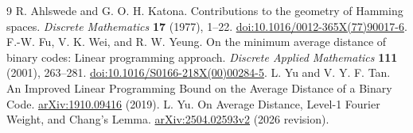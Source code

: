 \documentclass[11pt]{article}
\begin{document}
\begin{thebibliography}{9}
 R. Ahlswede and G. O. H. Katona. Contributions to the geometry of Hamming spaces. \emph{Discrete Mathematics} \textbf{17} (1977), 1--22. \href{https://doi.org/10.1016/0012-365X(77)90017-6}{doi:10.1016/0012-365X(77)90017-6}.
 F.-W. Fu, V. K. Wei, and R. W. Yeung. On the minimum average distance of binary codes: Linear programming approach. \emph{Discrete Applied Mathematics} \textbf{111} (2001), 263--281. \href{https://doi.org/10.1016/S0166-218X(00)00284-5}{doi:10.1016/S0166-218X(00)00284-5}.
 L. Yu and V. Y. F. Tan. An Improved Linear Programming Bound on the Average Distance of a Binary Code. \href{https://arxiv.org/abs/1910.09416}{arXiv:1910.09416} (2019).
 L. Yu. On Average Distance, Level-1 Fourier Weight, and Chang's Lemma. \href{https://arxiv.org/abs/2504.02593v2}{arXiv:2504.02593v2} (2026 revision).
\end{thebibliography}
\end{document}
